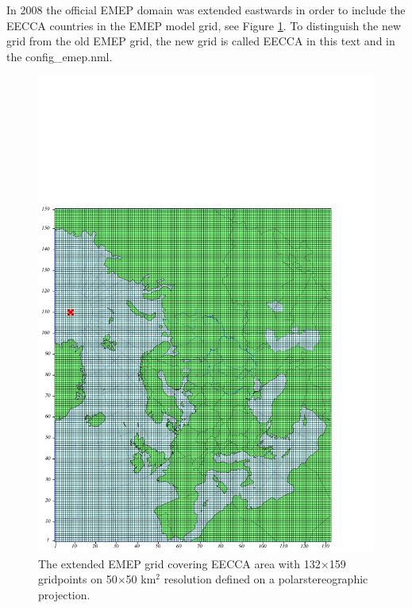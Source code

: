 In 2008 the official EMEP domain was extended eastwards in order to include the 
EECCA countries in the EMEP model grid, see Figure \ref{fig:EECCA}. To distinguish the new grid from the old EMEP 
grid, the new grid is called EECCA in this text and in the config\_emep.nml.

\begin{figure}[ht]
 \centering
\includegraphics[scale=0.7]{EECCA}
\caption{The extended EMEP grid covering EECCA area with
132$\times$159 gridpoints on 50$\times$50 km$^2$ resolution defined on a polarstereographic
projection.}\label{fig:EECCA}
\end{figure}



